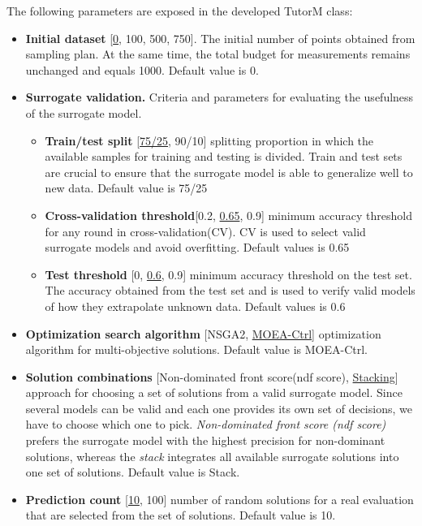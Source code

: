     The following parameters are exposed in the developed TutorM class:
    \begin{itemize}
        \item \textbf{Initial dataset} [\underline{0}, 100, 500, 750]. The initial number of points obtained from sampling plan. At the same time, the total budget for measurements remains unchanged and equals 1000. Default value is 0.
        \item \textbf{Surrogate validation.} Criteria and parameters for evaluating the usefulness of the surrogate model.
            \begin{itemize}
                \item \textbf{Train/test split} [\underline{75/25}, 90/10] splitting proportion in which the available samples for training and testing is divided. Train and test sets are crucial to ensure that the surrogate model is able to generalize well to new data. Default value is 75/25
                \item \textbf{Cross-validation threshold}[0.2, \underline{0.65}, 0.9] minimum accuracy threshold for any round in cross-validation(CV). CV is used to select valid surrogate models and avoid overfitting. Default values is 0.65
                \item \textbf{Test threshold} [0, \underline{0.6}, 0.9] minimum accuracy threshold on the test set. The accuracy obtained from the test set and is used to verify valid models of how they extrapolate unknown data. Default values is 0.6
            \end{itemize}
        \item \textbf{Optimization search algorithm} [NSGA2, \underline{MOEA-Ctrl}] optimization algorithm for multi-objective solutions. Default value is MOEA-Ctrl.
        \item \textbf{Solution combinations} [Non-dominated front score(ndf score), \underline{Stacking}] approach for choosing a set of solutions from a valid surrogate model. Since several models can be valid and each one provides its own set of decisions, we have to choose which one to pick. \emph{Non-dominated front score (ndf score)} prefers the surrogate model with the highest precision for non-dominant solutions, whereas the \emph{stack} integrates all available surrogate solutions into one set of solutions. Default value is Stack.
        \item \textbf{Prediction count} [\underline{10}, 100] number of random solutions for a real evaluation that are selected from the set of solutions. Default value is 10.
    \end{itemize}

